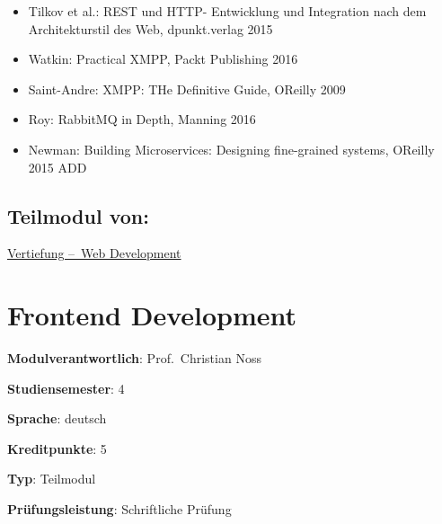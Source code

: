 \begin{itemize}
\tightlist
\item
  Tilkov et al.: REST und HTTP- Entwicklung und Integration nach dem
  Architekturstil des Web, dpunkt.verlag 2015
\item
  Watkin: Practical XMPP, Packt Publishing 2016
\item
  Saint-Andre: XMPP: THe Definitive Guide, OReilly 2009
\item
  Roy: RabbitMQ in Depth, Manning 2016
\item
  Newman: Building Microservices: Designing fine-grained systems,
  OReilly 2015 ADD
\end{itemize}

\hypertarget{teilmodul-vonpathlabelmi-2017modulbeschreibungen-bachelorba_wd_frameworks-daten-und-dienste}{%
\section*{Teilmodul
von:\label{/mi-2017/modulbeschreibungen-bachelor/BA_WD_Frameworks-daten-und-dienste}}\label{teilmodul-vonpathlabelmi-2017modulbeschreibungen-bachelorba_wd_frameworks-daten-und-dienste}}

\hyperref[/mi-2017/modulbeschreibungen-bachelor/BA_Vertiefung-Web_Development]{Vertiefung – Web Development}

\hypertarget{frontend-developmentpathlabelmi-2017modulbeschreibungen-bachelorba_wd_frontend-development}{%
\chapter{Frontend
Development\label{/mi-2017/modulbeschreibungen-bachelor/BA_WD_Frontend-Development}}\label{frontend-developmentpathlabelmi-2017modulbeschreibungen-bachelorba_wd_frontend-development}}

\begin{modulHead}
\textbf{Modulverantwortlich}: Prof.~Christian
Noss
\end{modulHead}
\begin{modulHead}
\textbf{Studiensemester}:
4
\end{modulHead}
\begin{modulHead}
\textbf{Sprache}:
deutsch
\end{modulHead}
\begin{modulHead}
\textbf{Kreditpunkte}:
5
\end{modulHead}
\begin{modulHead}
\textbf{Typ}:
Teilmodul
\end{modulHead}
\begin{modulHead}
\textbf{Prüfungsleistung}:
Schriftliche Prüfung
\end{modulHead}


